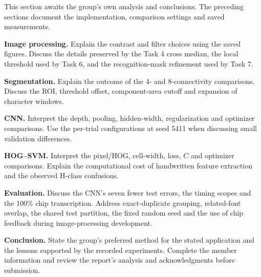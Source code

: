 This section awaits the group's own analysis and conclusions. The preceding sections document the implementation, comparison settings and saved measurements.

\textbf{Image processing.} Explain the contrast and filter choices using the saved figures. Discuss the details preserved by the Task 4 cross median, the local threshold used by Task 6, and the recognition-mask refinement used by Task 7.

\textbf{Segmentation.} Explain the outcome of the 4- and 8-connectivity comparisons. Discuss the ROI, threshold offset, component-area cutoff and expansion of character windows.

\textbf{CNN.} Interpret the depth, pooling, hidden-width, regularization and optimizer comparisons. Use the per-trial configurations at seed 5411 when discussing small validation differences.

\textbf{HOG--SVM.} Interpret the pixel/HOG, cell-width, loss, $C$ and optimizer comparisons. Explain the computational cost of handwritten feature extraction and the observed H-class confusions.

\textbf{Evaluation.} Discuss the CNN's seven fewer test errors, the timing scopes and the 100\% chip transcription. Address exact-duplicate grouping, related-font overlap, the shared test partition, the fixed random seed and the use of chip feedback during image-processing development.

\textbf{Conclusion.} State the group's preferred method for the stated application and the lessons supported by the recorded experiments. Complete the member information and review the report's analysis and acknowledgments before submission.

